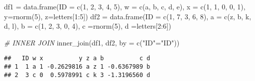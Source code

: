 \documentclass[
]{article}
\newenvironment{Shaded}{\begin{snugshade}}{\end{snugshade}}
\newcommand{\AttributeTok}[1]{\textcolor[rgb]{0.77,0.63,0.00}{#1}}
\newcommand{\CommentTok}[1]{\textcolor[rgb]{0.56,0.35,0.01}{\textit{#1}}}
\newcommand{\DecValTok}[1]{\textcolor[rgb]{0.00,0.00,0.81}{#1}}
\newcommand{\FunctionTok}[1]{\textcolor[rgb]{0.00,0.00,0.00}{#1}}
\newcommand{\NormalTok}[1]{#1}
\newcommand{\OtherTok}[1]{\textcolor[rgb]{0.56,0.35,0.01}{#1}}
\newcommand{\SpecialCharTok}[1]{\textcolor[rgb]{0.00,0.00,0.00}{#1}}
\newcommand{\StringTok}[1]{\textcolor[rgb]{0.31,0.60,0.02}{#1}}
\begin{document}
\begin{Shaded}
\begin{Highlighting}[]
\NormalTok{df1 }\OtherTok{=} \FunctionTok{data.frame}\NormalTok{(}\AttributeTok{ID =} \FunctionTok{c}\NormalTok{(}\DecValTok{1}\NormalTok{, }\DecValTok{2}\NormalTok{, }\DecValTok{3}\NormalTok{, }\DecValTok{4}\NormalTok{, }\DecValTok{5}\NormalTok{),}
\AttributeTok{w =} \FunctionTok{c}\NormalTok{(}\StringTok{\textquotesingle{}a\textquotesingle{}}\NormalTok{, }\StringTok{\textquotesingle{}b\textquotesingle{}}\NormalTok{, }\StringTok{\textquotesingle{}c\textquotesingle{}}\NormalTok{, }\StringTok{\textquotesingle{}d\textquotesingle{}}\NormalTok{, }\StringTok{\textquotesingle{}e\textquotesingle{}}\NormalTok{),}
\AttributeTok{x =} \FunctionTok{c}\NormalTok{(}\DecValTok{1}\NormalTok{, }\DecValTok{1}\NormalTok{, }\DecValTok{0}\NormalTok{, }\DecValTok{0}\NormalTok{, }\DecValTok{1}\NormalTok{),}
\AttributeTok{y=}\FunctionTok{rnorm}\NormalTok{(}\DecValTok{5}\NormalTok{),}
\AttributeTok{z=}\NormalTok{letters[}\DecValTok{1}\SpecialCharTok{:}\DecValTok{5}\NormalTok{])}
\NormalTok{df2 }\OtherTok{=} \FunctionTok{data.frame}\NormalTok{(}\AttributeTok{ID =} \FunctionTok{c}\NormalTok{(}\DecValTok{1}\NormalTok{, }\DecValTok{7}\NormalTok{, }\DecValTok{3}\NormalTok{, }\DecValTok{6}\NormalTok{, }\DecValTok{8}\NormalTok{),}
\AttributeTok{a =} \FunctionTok{c}\NormalTok{(}\StringTok{\textquotesingle{}z\textquotesingle{}}\NormalTok{, }\StringTok{\textquotesingle{}b\textquotesingle{}}\NormalTok{, }\StringTok{\textquotesingle{}k\textquotesingle{}}\NormalTok{, }\StringTok{\textquotesingle{}d\textquotesingle{}}\NormalTok{, }\StringTok{\textquotesingle{}l\textquotesingle{}}\NormalTok{),}
\AttributeTok{b =} \FunctionTok{c}\NormalTok{(}\DecValTok{1}\NormalTok{, }\DecValTok{2}\NormalTok{, }\DecValTok{3}\NormalTok{, }\DecValTok{0}\NormalTok{, }\DecValTok{4}\NormalTok{),}
\AttributeTok{c =}\FunctionTok{rnorm}\NormalTok{(}\DecValTok{5}\NormalTok{),}
\AttributeTok{d =}\NormalTok{letters[}\DecValTok{2}\SpecialCharTok{:}\DecValTok{6}\NormalTok{])}

\CommentTok{\# INNER JOIN}
\FunctionTok{inner\_join}\NormalTok{(df1, df2, }\AttributeTok{by =} \FunctionTok{c}\NormalTok{(}\StringTok{"ID"}\OtherTok{=}\StringTok{"ID"}\NormalTok{))}
\end{Highlighting}
\end{Shaded}

\begin{verbatim}
##   ID w x          y z a b          c d
## 1  1 a 1 -0.2629816 a z 1 -0.6367989 b
## 2  3 c 0  0.5978991 c k 3 -1.3196560 d
\end{verbatim}
\end{document}
